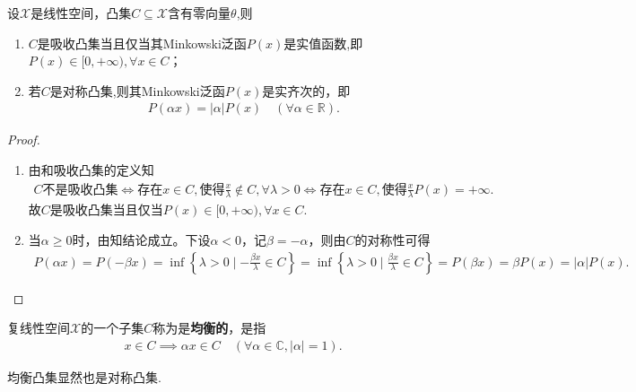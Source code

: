 \documentclass[../../main.tex]{subfiles}%
\begin{document}
\begin{proposition}\label{proposition:吸收凸集和对称凸集的等价}
设$\mathscr{X}$是线性空间，凸集$C\subseteq \mathscr{X}$含有零向量$\theta$,则
\begin{enumerate}[(1)]
\item $C$是吸收凸集当且仅当其Minkowski泛函$P(x)$是实值函数,即$P(x)\in [0,+\infty),\forall x\in C$；

\item 若$C$是对称凸集,则其Minkowski泛函$P(x)$是实齐次的，即
\begin{align*}
P(\alpha x) = |\alpha| P(x) \quad (\forall \alpha \in \mathbb{R}).
\end{align*}
\end{enumerate}
\end{proposition}
\begin{proof}
\begin{enumerate}[(1)]
\item 由和吸收凸集的定义知
\begin{align*}
C\text{不是吸收凸集}\Longleftrightarrow \text{存在}x\in C,\text{使得}\frac{x}{\lambda}\notin C,\forall \lambda >0\Longleftrightarrow \text{存在}x\in C,\text{使得}\frac{x}{\lambda}P\left( x \right) =+\infty .
\end{align*}
故$C$是吸收凸集当且仅当$P(x)\in [0,+\infty),\forall x\in C$.

\item 当$\alpha \geqslant 0$时，由知结论成立。下设$\alpha <0$，记$\beta =-\alpha$，则由$C$的对称性可得
\begin{align*}
P(\alpha x) = P(-\beta x) = \inf\left\{ \lambda >0 \mid -\frac{\beta x}{\lambda}\in C \right\} = \inf\left\{ \lambda >0 \mid \frac{\beta x}{\lambda}\in C \right\} = P(\beta x) = \beta P(x) = |\alpha| P(x).
\end{align*}
\end{enumerate}
\end{proof}

\begin{definition}
复线性空间$\mathscr{X}$的一个子集$C$称为是\textbf{均衡的}，是指
\begin{align*}
x \in C \implies \alpha x \in C \quad (\forall \alpha \in \mathbb{C}, |\alpha| = 1).
\end{align*}
\end{definition}
\begin{remark}
均衡凸集显然也是对称凸集.
\end{remark}
\end{document}

